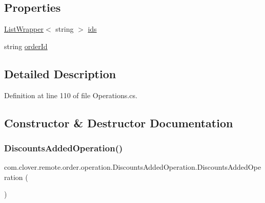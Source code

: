 \subsection*{Properties}
\begin{DoxyCompactItemize}
\item 
\hyperlink{classcom_1_1clover_1_1remote_1_1order_1_1_list_wrapper}{List\+Wrapper}$<$ string $>$ \hyperlink{classcom_1_1clover_1_1remote_1_1order_1_1operation_1_1_discounts_added_operation_aa0b65b098878b28fb18f2986abb36487}{ids}
\item 
string \hyperlink{classcom_1_1clover_1_1remote_1_1order_1_1operation_1_1_discounts_added_operation_a26508f0e0f75902bd4f348b74a831c8b}{order\+Id}
\end{DoxyCompactItemize}


\subsection{Detailed Description}


Definition at line 110 of file Operations.\+cs.



\subsection{Constructor \& Destructor Documentation}
\mbox{\label{classcom_1_1clover_1_1remote_1_1order_1_1operation_1_1_discounts_added_operation_a7fdd603245a95a6e40fa91263dd5f560}} 
\subsubsection{\texorpdfstring{Discounts\+Added\+Operation()}{DiscountsAddedOperation()}\hspace{0.1cm}{\footnotesize\ttfamily [1/2]}}
{\footnotesize\ttfamily com.\+clover.\+remote.\+order.\+operation.\+Discounts\+Added\+Operation.\+Discounts\+Added\+Operation (\begin{DoxyParamCaption}{ }\end{DoxyParamCaption})}



